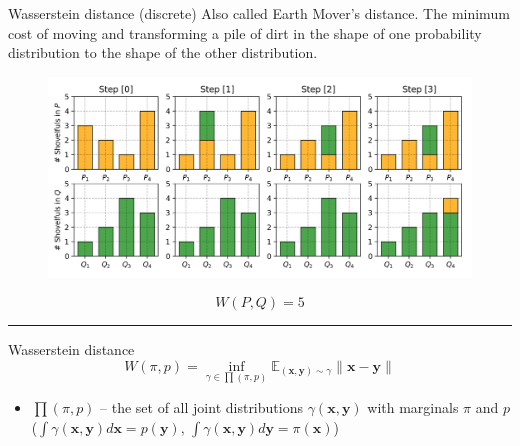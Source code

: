 \documentclass{beamer}
\newcommand{\bx}{\mathbf{x}}
\newcommand{\by}{\mathbf{y}}
\newcommand{\bbE}{\mathbb{E}}
\begin{document}
\begin{frame}{Wasserstein distance (discrete)}
	Also called Earth Mover's distance.
	The minimum cost of moving and transforming a pile of dirt in the shape of one probability distribution to the shape of the other distribution.
	\begin{figure}
		\centering
		\includegraphics[width=.9\linewidth]{figs/EM_distance_discrete}
	\end{figure}
	\[
		W(P, Q) = 5
	\]
	\vfill
	\hrule{}
	
\end{frame}
\begin{frame}{Wasserstein distance}
	\[
		W(\pi, p) = \inf_{\gamma \in \prod(\pi, p)} \bbE_{(\bx, \by) \sim \gamma} \| \bx - \by \|
	\]
	\begin{itemize}
		\item $\prod(\pi, p)$ -- the set of all joint distributions $\gamma (\bx, \by)$ with marginals $\pi$ and $p$ ($\int \gamma(\bx, \by) d \bx = p(\by)$, $\int \gamma(\bx, \by) d \by = \pi(\bx)$)
	\end{itemize}
\end{frame}
\end{document}

